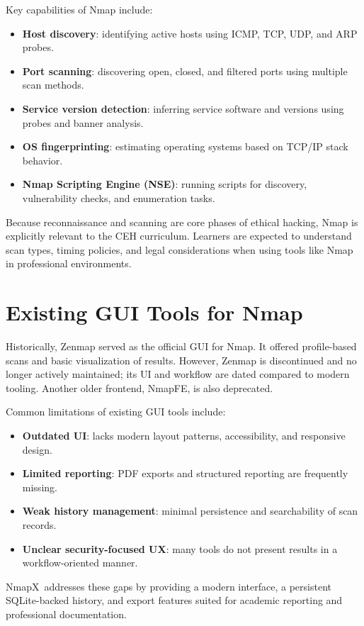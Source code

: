 \documentclass[12pt, a4paper]{report}
\newcommand{\NmapX}{NmapX}
\begin{document}
Key capabilities of Nmap include:
\begin{itemize}[leftmargin=2.2em]
  \item \textbf{Host discovery}: identifying active hosts using ICMP, TCP, UDP, and ARP probes.
  \item \textbf{Port scanning}: discovering open, closed, and filtered ports using multiple scan methods.
  \item \textbf{Service version detection}: inferring service software and versions using probes and banner analysis.
  \item \textbf{OS fingerprinting}: estimating operating systems based on TCP/IP stack behavior.
  \item \textbf{Nmap Scripting Engine (NSE)}: running scripts for discovery, vulnerability checks, and enumeration tasks.
\end{itemize}

Because reconnaissance and scanning are core phases of ethical hacking, Nmap is explicitly relevant to the CEH curriculum. Learners are expected to understand scan types, timing policies, and legal considerations when using tools like Nmap in professional environments.

\section{Existing GUI Tools for Nmap}
Historically, Zenmap served as the official GUI for Nmap. It offered profile-based scans and basic visualization of results. However, Zenmap is discontinued and no longer actively maintained; its UI and workflow are dated compared to modern tooling. Another older frontend, NmapFE, is also deprecated.

Common limitations of existing GUI tools include:
\begin{itemize}[leftmargin=2.2em]
  \item \textbf{Outdated UI}: lacks modern layout patterns, accessibility, and responsive design.
  \item \textbf{Limited reporting}: PDF exports and structured reporting are frequently missing.
  \item \textbf{Weak history management}: minimal persistence and searchability of scan records.
  \item \textbf{Unclear security-focused UX}: many tools do not present results in a workflow-oriented manner.
\end{itemize}

\NmapX\ addresses these gaps by providing a modern interface, a persistent SQLite-backed history, and export features suited for academic reporting and professional documentation.
\end{document}
